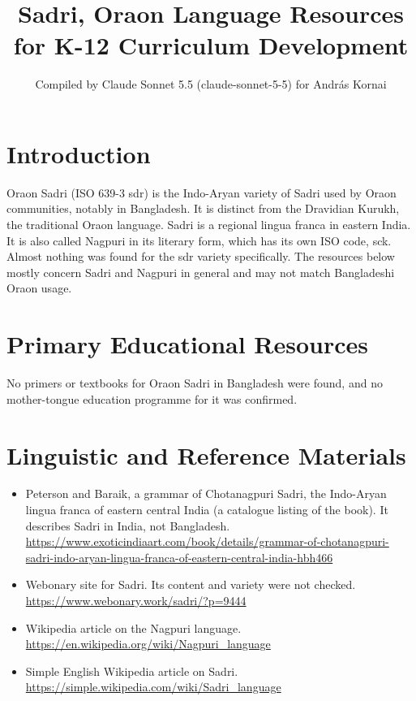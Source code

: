 \documentclass[12pt]{article}
\title{Sadri, Oraon Language Resources for K-12 Curriculum Development}
\author{Compiled by Claude Sonnet 5.5 (claude-sonnet-5-5) for Andr\'as Kornai}
\date{}
\begin{document}
\maketitle

\section{Introduction}
Oraon Sadri (ISO 639-3 sdr) is the Indo-Aryan variety of Sadri used by Oraon communities, notably in Bangladesh. It is distinct from the Dravidian Kurukh, the traditional Oraon language. Sadri is a regional lingua franca in eastern India. It is also called Nagpuri in its literary form, which has its own ISO code, sck. Almost nothing was found for the sdr variety specifically. The resources below mostly concern Sadri and Nagpuri in general and may not match Bangladeshi Oraon usage.

\section{Primary Educational Resources}
No primers or textbooks for Oraon Sadri in Bangladesh were found, and no mother-tongue education programme for it was confirmed.

\section{Linguistic and Reference Materials}
\begin{itemize}
\item Peterson and Baraik, a grammar of Chotanagpuri Sadri, the Indo-Aryan lingua franca of eastern central India (a catalogue listing of the book). It describes Sadri in India, not Bangladesh. \url{https://www.exoticindiaart.com/book/details/grammar-of-chotanagpuri-sadri-indo-aryan-lingua-franca-of-eastern-central-india-hbh466}
\item Webonary site for Sadri. Its content and variety were not checked. \url{https://www.webonary.work/sadri/?p=9444}
\item Wikipedia article on the Nagpuri language. \url{https://en.wikipedia.org/wiki/Nagpuri_language}
\item Simple English Wikipedia article on Sadri. \url{https://simple.wikipedia.com/wiki/Sadri_language}
\end{itemize}
\end{document}
